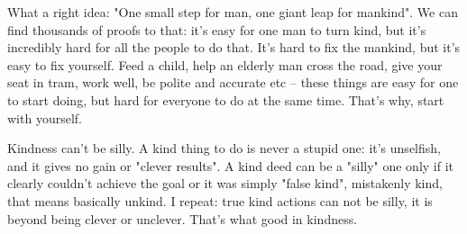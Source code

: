 What a right idea: "One small step for man, one giant leap for mankind". We can find thousands of proofs to that: it's easy for one man to turn kind, but it's incredibly hard for all the people to do that. It's hard to fix the mankind, but it's easy to fix yourself. Feed a child, help an elderly man cross the road, give your seat in tram, work well, be polite and accurate etc -- these things are easy for one to start doing, but hard for everyone to do at the same time. That's why, start with yourself.

Kindness can't be silly. A kind thing to do is never a stupid one: it's unselfish, and it gives no gain or "clever results". A kind deed can be a "silly" one only if it clearly couldn't achieve the goal or it was simply "false kind", mistakenly kind, that means basically unkind. I repeat: true kind actions can not be silly, it is beyond being clever or unclever. That's what good in kindness.